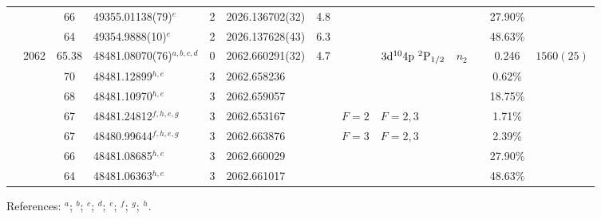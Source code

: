\begin{table*}
\begin{center}
{\begin{tabular}{:l;l;c;l;c;l;c;l;l;c;c;c;c}
\rowstyle{\itshape}               &        & 66        & 49355.01138(79)$^{e}$            & 2 &   2026.136702(32)  &  4.8 & $                                        $ & $                                        $ & $      $ &              & 27.90\%   & $          $\\
\rowstyle{\itshape}               &        & 64        & 49354.9888(10)$^{e}$             & 2 &   2026.137628(43)  &  6.3 & $                                        $ & $                                        $ & $      $ &              & 48.63\%   & $          $\\
                                  & 2062   & 65.38     & 48481.08070(76)$^{a,b,c,d}$      & 0 &   2062.660291(32)  &  4.7 & $                                        $ & $3\rm{d}^{10}4\rm{p}~^2\rm{P}_{1/2}      $ & $n_{2} $ &              & 0.246     & $ 1560(25) $\\
\rowstyle{\itshape}               &        & 70        & 48481.12899$^{h,e}$              & 3 &   2062.658236      &      & $                                        $ & $                                        $ & $      $ &              & 0.62\%    & $          $\\
\rowstyle{\itshape}               &        & 68        & 48481.10970$^{h,e}$              & 3 &   2062.659057      &      & $                                        $ & $                                        $ & $      $ &              & 18.75\%   & $          $\\
\rowstyle{\itshape}               &        & 67        & 48481.24812$^{f,h,e,g}$          & 3 &   2062.653167      &      & $F=2                                     $ & $F=2,3                                   $ & $      $ &              & 1.71\%    & $          $\\
\rowstyle{\itshape}               &        & 67        & 48480.99644$^{f,h,e,g}$          & 3 &   2062.663876      &      & $F=3                                     $ & $F=2,3                                   $ & $      $ &              & 2.39\%    & $          $\\
\rowstyle{\itshape}               &        & 66        & 48481.08685$^{h,e}$              & 3 &   2062.660029      &      & $                                        $ & $                                        $ & $      $ &              & 27.90\%   & $          $\\
\rowstyle{\itshape}               &        & 64        & 48481.06363$^{h,e}$              & 3 &   2062.661017      &      & $                                        $ & $                                        $ & $      $ &              & 48.63\%   & $          $\\
\hline
\end{tabular}
}
{\footnotesize References:
$^{a}$\citet{Aldenius:2009:014008};
$^{b}$\citet{Pickering:2000:163};
$^{c}$\citet{Ruffoni:2010:424};
$^{d}$\citet{Nave:2012:1570};
$^{e}$\citet{Matsubara:2003:209};
$^{f}$\citet{Campbell:1997:2351};
$^{g}$\citet{Dixit:2008:025001};
$^{h}$\citet{Berengut:2003:022502}.}
\end{center}
\end{table*}

